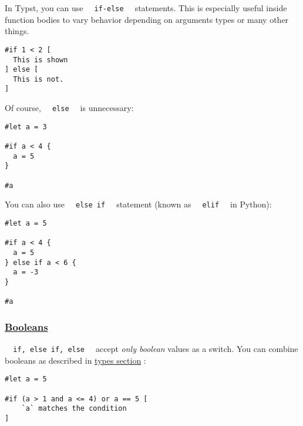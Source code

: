 In Typst, you can use \texttt{\ }{\texttt{\ if-else\ }}\texttt{\ }
statements. This is especially useful inside function bodies to vary
behavior depending on arguments types or many other things.

\begin{verbatim}
#if 1 < 2 [
  This is shown
] else [
  This is not.
]
\end{verbatim}

\pandocbounded{}

Of course, \texttt{\ }{\texttt{\ else\ }}\texttt{\ } is unnecessary:

\begin{verbatim}
#let a = 3

#if a < 4 {
  a = 5
}

#a
\end{verbatim}

\pandocbounded{}

You can also use \texttt{\ }{\texttt{\ else\ if\ }}\texttt{\ } statement
(known as \texttt{\ }{\texttt{\ elif\ }}\texttt{\ } in Python):

\begin{verbatim}
#let a = 5

#if a < 4 {
  a = 5
} else if a < 6 {
  a = -3
}

#a
\end{verbatim}

\pandocbounded{}

\subsubsection{\texorpdfstring{\hyperref[booleans]{Booleans}}{Booleans}}\label{booleans}

\texttt{\ }{\texttt{\ if,\ else\ if,\ else\ }}\texttt{\ } accept
\emph{only boolean} values as a switch. You can combine booleans as
described in \href{./types.html\#boolean-bool}{types section} :

\begin{verbatim}
#let a = 5

#if (a > 1 and a <= 4) or a == 5 [
    `a` matches the condition
]
\end{verbatim}

